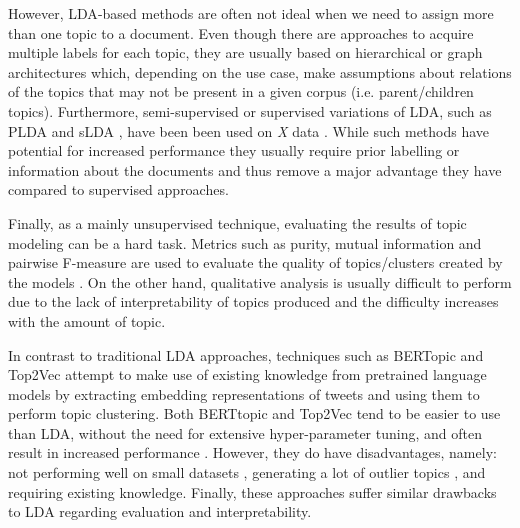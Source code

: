 However, \ac{LDA}-based methods are often not ideal when we need to assign more than one topic to a document. Even though there are approaches to acquire multiple labels for each topic, they are usually based on hierarchical \cite{griffiths2003hierarchical} or graph \cite{li2006pachinko} architectures which, depending on the use case, make assumptions about relations of the topics that may not be present in a given corpus (i.e. parent/children topics). Furthermore, semi-supervised or supervised variations of \ac{LDA}, such as PLDA \cite{ramage2011partially} and sLDA \cite{mcauliffe2007supervised}, have been been used on \textit{X} data \cite{resnik2015beyond, ashktorab2014tweedr}. While such methods have potential for increased performance they usually require prior labelling or information about the documents and thus remove a major advantage they have compared to supervised approaches. 

Finally, as a mainly unsupervised technique, evaluating the results of topic modeling can be a hard task. Metrics such as purity, mutual information and pairwise F-measure are used to evaluate the quality of topics/clusters created by the models \cite{nugroho2020survey}. On the other hand, qualitative analysis is usually difficult to perform due to the lack of interpretability of topics produced and the difficulty increases with the amount of topic.

In contrast to traditional \ac{LDA} approaches, techniques such as BERTopic \cite{bertopic} and Top2Vec \cite{angelov2020top2vec} attempt to make use of existing knowledge from pretrained language models by extracting embedding representations of tweets and using them to perform topic clustering. Both BERTtopic and Top2Vec tend to be easier to use than \ac{LDA}, without the need for extensive hyper-parameter tuning, and often result in increased performance \cite{egger2022topic}. However, they do have disadvantages, namely: not performing well on small datasets \cite{abuzayed2021bert}, generating a lot of outlier topics \cite{silveira2021topic}, and requiring existing knowledge. Finally, these approaches suffer similar drawbacks to \ac{LDA} regarding evaluation and interpretability.

